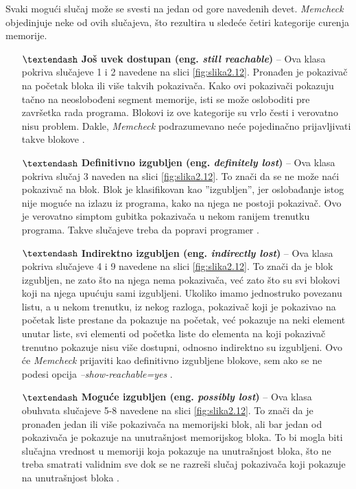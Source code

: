 \documentclass[12pt,oneside]{memoir}
\theoremstyle{plain}
\theoremstyle{definition}
\begin{document}
Svaki mogući slučaj može se svesti na jedan od gore navedenih devet. \textit{Memcheck} objedinjuje neke od ovih slučajeva, što rezultira u sledeće četiri kategorije curenja memorije.
\begin{itemize}
\item[$\textendash$] \textbf{Još uvek dostupan (eng. \textit{still reachable})} – Ova klasa pokriva slučajeve 1 i 2 navedene na slici \ref{fig:slika2.12}. Pronađen je pokazivač na početak bloka ili više takvih pokazivača. Kako ovi pokazivači pokazuju tačno na neoslobođeni segment memorije, isti se može osloboditi pre završetka rada programa. Blokovi iz ove kategorije su vrlo česti i verovatno nisu problem. Dakle, \textit{Memcheck} podrazumevano neće pojedinačno prijavljivati takve blokove \cite{Memcheck}.
\item[$\textendash$] \textbf{Definitivno izgubljen (eng. \textit{definitely lost})} – Ova klasa pokriva slučaj 3 naveden na slici \ref{fig:slika2.12}. To znači da se ne može naći pokazivač na blok. Blok je klasifikovan kao ''izgubljen'', jer oslobađanje istog nije moguće na izlazu iz programa, kako na njega ne postoji pokazivač. Ovo je verovatno simptom gubitka pokazivača u nekom ranijem trenutku programa. Takve slučajeve treba da popravi programer \cite{Memcheck}.
\item[$\textendash$] \textbf{Indirektno izgubljen (eng. \textit{indirectly lost})} – Ova klasa pokriva slučajeve 4 i 9 navedene na slici \ref{fig:slika2.12}. To znači da je blok izgubljen, ne zato što na njega nema pokazivača, već zato što su svi blokovi koji na njega upućuju sami izgubljeni. Ukoliko imamo jednostruko povezanu listu, a u nekom trenutku, iz nekog razloga, pokazivač koji je pokazivao na početak liste prestane da pokazuje na početak, već pokazuje na neki element unutar liste, svi elementi od početka liste do elementa na koji pokazivač trenutno pokazuje nisu više dostupni, odnosno indirektno su izgubljeni. Ovo će \textit{Memcheck} prijaviti kao definitivno izgubljene blokove, sem ako se ne podesi opcija \textit{–show-reachable=yes} \cite{Memcheck}.
\item[$\textendash$] \textbf{Moguće izgubljen (eng. \textit{possibly lost})} – Ova klasa obuhvata slučajeve 5-8 navedene na slici \ref{fig:slika2.12}. To znači da je pronađen jedan ili više pokazivača na memorijski blok, ali bar jedan od pokazivača je pokazuje na unutrašnjost memorijskog bloka. To bi mogla biti  slučajna vrednost u memoriji koja pokazuje na unutrašnjost bloka, što ne treba smatrati validnim sve dok se ne razreši slučaj pokazivača koji pokazuje na unutrašnjost bloka \cite{Memcheck}.
\end{itemize}
\end{document}
